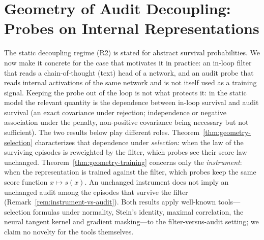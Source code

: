 
\section{Geometry of Audit Decoupling: Probes on Internal Representations}\label{sec:geometry}

The static decoupling regime (R2) is stated for abstract survival probabilities. We now make it concrete for the case that motivates it in practice: an in-loop filter that reads a chain-of-thought (text) head of a network, and an audit probe that reads internal activations of the same network and is not itself used as a training signal. Keeping the probe out of the loop is not what protects it: in the static model the relevant quantity is the dependence between in-loop survival and audit survival (an exact covariance under rejection; independence or negative association under the penalty, non-positive covariance being necessary but not sufficient). The two results below play different roles. Theorem~\ref{thm:geometry-selection} characterizes that dependence under \emph{selection}: when the law of the surviving episodes is reweighted by the filter, which probes see their score law unchanged. Theorem~\ref{thm:geometry-training} concerns only the \emph{instrument}: when the representation is trained against the filter, which probes keep the same score function $x \mapsto s(x)$. An unchanged instrument does not imply an unchanged audit among the episodes that survive the filter (Remark~\ref{rem:instrument-vs-audit}). Both results apply well-known tools---selection formulas under normality, Stein's identity, maximal correlation, the neural tangent kernel and gradient masking---to the filter-versus-audit setting; we claim no novelty for the tools themselves.

